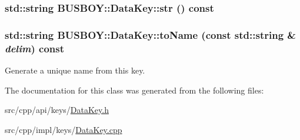 \label{classBUSBOY_1_1DataKey_a4697967447ea5edb6455abfe305fdeb4}
\hypertarget{classBUSBOY_1_1DataKey_a52c707f89b0874730eb4b9fad1692e8d}{
\subsubsection[{str}]{\setlength{\rightskip}{0pt plus 5cm}std::string BUSBOY::DataKey::str () const}}
\label{classBUSBOY_1_1DataKey_a52c707f89b0874730eb4b9fad1692e8d}
\hypertarget{classBUSBOY_1_1DataKey_aa48ef3beade55dbf91414cea8f5dbdf3}{
\subsubsection[{toName}]{\setlength{\rightskip}{0pt plus 5cm}std::string BUSBOY::DataKey::toName (const std::string \& {\em delim}) const}}
\label{classBUSBOY_1_1DataKey_aa48ef3beade55dbf91414cea8f5dbdf3}


Generate a unique name from this key. 

The documentation for this class was generated from the following files:\begin{DoxyCompactItemize}
\item 
src/cpp/api/keys/\hyperlink{DataKey_8h}{DataKey.h}\item 
src/cpp/impl/keys/\hyperlink{DataKey_8cpp}{DataKey.cpp}\end{DoxyCompactItemize}
